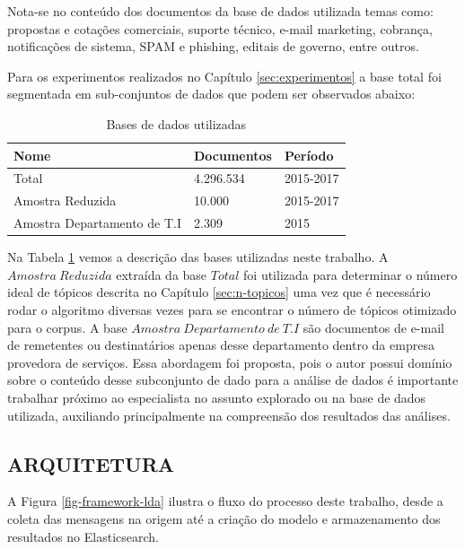 \documentclass[12pt,a4paper]{article}
\begin{document}
Nota-se no conteúdo dos documentos da base de dados utilizada temas como: propostas e cotações comerciais, suporte técnico,
 e-mail marketing, cobrança, notificações de sistema, SPAM e phishing, editais de governo, entre outros.

Para os experimentos realizados no Capítulo \ref{sec:experimentos} a base total foi segmentada em sub-conjuntos de dados que podem ser observados abaixo:

\begin{table}[H]
  \centering
  \begin{tabular}{l l l}
  Nome  		              & Documentos & Período\\
  \hline
  Total                           & 4.296.534 & 2015-2017 \\
  Amostra Reduzida	              & 10.000    & 2015-2017 \\
  Amostra Departamento de T.I		  & 2.309     & 2015      \\
  \hline
  \end{tabular}
  \caption{Bases de dados utilizadas}
  \label{tab-base-de-dados}
\end{table}

Na Tabela \ref{tab-base-de-dados} vemos a descrição das bases utilizadas neste trabalho. A $Amostra\ Reduzida$ extraída da base $Total$ foi utilizada para determinar o número ideal de tópicos
 descrita no Capítulo \ref{sec:n-topicos} uma vez que é necessário rodar o algoritmo diversas vezes para se encontrar o número de tópicos otimizado para 
 o corpus. A base $Amostra\ Departamento\ de\ T.I$ são documentos de e-mail de remetentes ou destinatários apenas desse departamento dentro da empresa provedora
 de serviços. Essa abordagem foi proposta, pois o autor possui domínio sobre o conteúdo desse subconjunto de dado para a análise de dados é importante trabalhar próximo ao especialista
 no assunto explorado ou na base de dados utilizada, auxiliando principalmente na compreensão dos resultados das análises.

 \subsection{ARQUITETURA} \label{sec:arquitetura}

 A Figura \ref{fig-framework-lda} ilustra o fluxo do processo deste trabalho, desde a coleta das mensagens na origem até a criação do modelo e armazenamento dos resultados no Elasticsearch.
\end{document}
